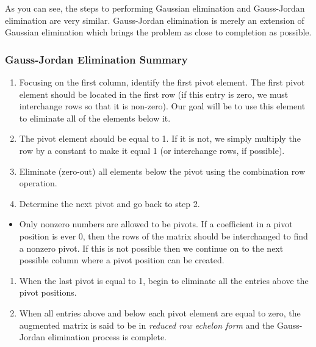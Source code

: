 \documentclass[
]{article}
\providecommand{\tightlist}{%
  \setlength{\itemsep}{0pt}\setlength{\parskip}{0pt}}
\theoremstyle{definition}
\theoremstyle{definition}
\theoremstyle{definition}
\theoremstyle{definition}
\theoremstyle{remark}
\begin{document}
As you can see, the steps to performing Gaussian elimination and Gauss-Jordan elimination are very similar. Gauss-Jordan elimination is merely an extension of Gaussian elimination which brings the problem as close to completion as possible.

\hypertarget{gauss-jordan-elimination-summary}{%
\subsubsection{Gauss-Jordan Elimination Summary}\label{gauss-jordan-elimination-summary}}

\begin{enumerate}
\def\labelenumi{\arabic{enumi}.}
\tightlist
\item
  Focusing on the first column, identify the first pivot element. The first pivot element should be located in the first row (if this entry is zero, we must interchange rows so that it is non-zero). Our goal will be to use this element to eliminate all of the elements below it.\\
\item
  The pivot element should be equal to 1. If it is not, we simply multiply the row by a constant to make it equal 1 (or interchange rows, if possible).
\item
  Eliminate (zero-out) all elements below the pivot using the combination row operation.
\item
  Determine the next pivot and go back to step 2.
\end{enumerate}

\begin{itemize}
\tightlist
\item
  Only nonzero numbers are allowed to be pivots. If a coefficient in a pivot position is ever 0, then the rows of the matrix should be interchanged to find a nonzero pivot. If this is not possible then we continue on to the next possible column where a pivot position can be created.
\end{itemize}

\begin{enumerate}
\def\labelenumi{\arabic{enumi}.}
\setcounter{enumi}{4}
\tightlist
\item
  When the last pivot is equal to 1, begin to eliminate all the entries above the pivot positions.
\item
  When all entries above and below each pivot element are equal to zero, the augmented matrix is said to be in \emph{reduced row echelon form} and the Gauss-Jordan elimination process is complete.
\end{enumerate}
\end{document}
